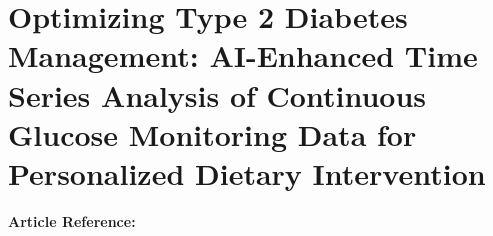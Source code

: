 


\section{Optimizing Type 2 Diabetes Management: AI-Enhanced Time Series Analysis of Continuous Glucose Monitoring Data for Personalized Dietary Intervention}
\textbf{Article Reference:} \cite{anjumOptimizingType22024}


